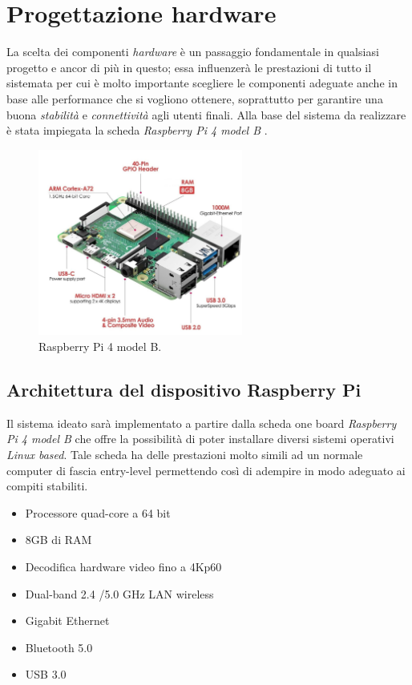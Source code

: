 \section{Progettazione hardware}
La scelta dei componenti \emph{hardware} è un passaggio fondamentale in qualsiasi progetto e ancor di più in questo; essa influenzerà le prestazioni di tutto il sistemata per cui è molto importante scegliere le componenti adeguate anche in base alle performance che si vogliono ottenere, soprattutto per garantire una buona \emph{stabilità} e \emph{connettività} agli utenti finali. Alla base del sistema da realizzare è stata impiegata la scheda \emph{Raspberry Pi 4 model B} \cite{rasp}.
\begin{figure}[h] \includegraphics[width=0.6\textwidth] {Tesi magistrale/capitoli/images/rasp.jpg}
\centering
\caption{Raspberry Pi 4 model B.}
\end{figure}

\subsection{Architettura del dispositivo Raspberry Pi}
Il sistema ideato sarà implementato a partire dalla scheda one board \emph{Raspberry Pi 4 model B} che offre la possibilità di poter installare diversi sistemi operativi \emph{Linux based}. Tale scheda ha delle prestazioni molto simili ad un normale computer di fascia entry-level permettendo così di adempire in modo adeguato ai compiti stabiliti. 
\begin{itemize}
    \item Processore quad-core a 64 bit
    \item 8GB di RAM
    \item Decodifica hardware video fino a 4Kp60
    \item Dual-band 2.4 /5.0 GHz LAN wireless
    \item Gigabit Ethernet
    \item Bluetooth 5.0
    \item USB 3.0
\end{itemize}

